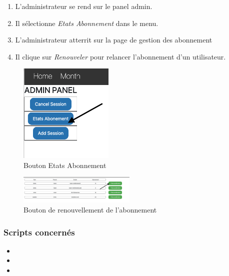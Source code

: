 \begin{enumerate}
	\item L'administrateur se rend sur le panel admin. 
	\item Il sélectionne \textit{Etats Abonnement} dans le menu. 
	\item L'administrateur atterrit sur la page de gestion des abonnement 
	\item Il clique sur \textit{Renouveler} pour relancer l'abonnement d'un utilisateur. 
\end{enumerate}

\begin{figure}[h]
	\includegraphics[width=0.4\textwidth,center]{Figures/us11-1}
	\caption{Bouton Etats Abonnement}
\end{figure}

\vspace{\baselineskip}
\vspace{\baselineskip}
\begin{figure}[h]
	\includegraphics[width=0.5\textwidth,center]{Figures/us11-2}
	\caption{Bouton de renouvellement de l'abonnement}
\end{figure}

\vspace{\baselineskip}
\subsubsection{Scripts concernés}
	\begin{itemize}
		\item {}
		\item {}
		\item {}
	\end{itemize}